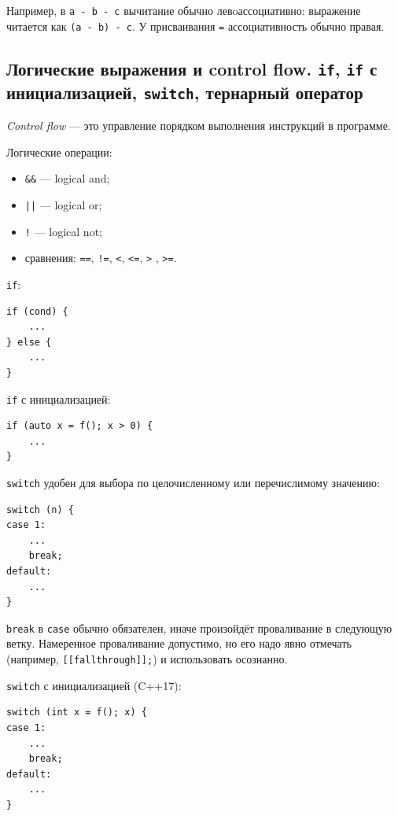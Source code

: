 \begin{remark}
Например, в \texttt{a - b - c} вычитание обычно левoассоциативно: выражение читается как \texttt{(a - b) - c}. У присваивания \texttt{=} ассоциативность обычно правая.
\end{remark}

\subsection{Логические выражения и control flow. \texttt{if}, \texttt{if} с инициализацией, \texttt{switch}, тернарный оператор}
\begin{definition}
\textit{Control flow} — это управление порядком выполнения инструкций в программе.
\end{definition}

Логические операции:
\begin{itemize}
    \item \texttt{\&\&} — logical and;
    \item \texttt{||} — logical or;
    \item \texttt{!} — logical not;
    \item сравнения: \texttt{==}, \texttt{!=}, \texttt{<}, \texttt{<=}, \texttt{>} , \texttt{>=}.
\end{itemize}

\texttt{if}:
\begin{verbatim}
if (cond) {
    ...
} else {
    ...
}
\end{verbatim}

\texttt{if} с инициализацией:
\begin{verbatim}
if (auto x = f(); x > 0) {
    ...
}
\end{verbatim}

\texttt{switch} удобен для выбора по целочисленному или перечислимому значению:
\begin{verbatim}
switch (n) {
case 1:
    ...
    break;
default:
    ...
}
\end{verbatim}

\texttt{break} в \texttt{case} обычно обязателен, иначе произойдёт проваливание в следующую ветку. Намеренное проваливание допустимо, но его надо явно отмечать (например, \texttt{[[fallthrough]];}) и использовать осознанно.

\texttt{switch} с инициализацией (C++17):
\begin{verbatim}
switch (int x = f(); x) {
case 1:
    ...
    break;
default:
    ...
}
\end{verbatim}

